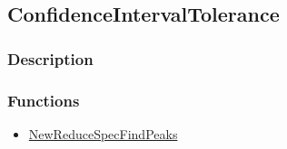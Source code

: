 \subsection{ConfidenceIntervalTolerance}\label{ConfidenceIntervalTolerance}
\subsubsection{Description}

\subsubsection{Functions}
\begin{itemize}
\item \hyperref[NewReduceSpecFindPeaks]{NewReduceSpecFindPeaks}
\end{itemize}

